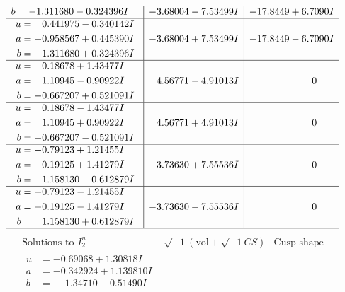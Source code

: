 \documentclass[1p]{elsarticle_modified}
\theoremstyle{definition}
\newcommand{\I}{\sqrt{-1}}
\begin{document}
$$\begin{array}{c|c|c}
\begin{aligned}
b &= -1.311680 - 0.324396 I\end{aligned}
 & -3.68004 - 7.53499 I & -17.8449 + 6.7090 I \\ \hline\begin{aligned}
u &= \phantom{-}0.441975 - 0.340142 I \\
a &= -0.958567 + 0.445390 I \\
b &= -1.311680 + 0.324396 I\end{aligned}
 & -3.68004 + 7.53499 I & -17.8449 - 6.7090 I \\ \hline\begin{aligned}
u &= \phantom{-}0.18678 + 1.43477 I \\
a &= \phantom{-}1.10945 - 0.90922 I \\
b &= -0.667207 + 0.521091 I\end{aligned}
 & \phantom{-}4.56771 - 4.91013 I & \phantom{-0.000000 } 0 \\ \hline\begin{aligned}
u &= \phantom{-}0.18678 - 1.43477 I \\
a &= \phantom{-}1.10945 + 0.90922 I \\
b &= -0.667207 - 0.521091 I\end{aligned}
 & \phantom{-}4.56771 + 4.91013 I & \phantom{-0.000000 } 0 \\ \hline\begin{aligned}
u &= -0.79123 + 1.21455 I \\
a &= -0.19125 + 1.41279 I \\
b &= \phantom{-}1.158130 - 0.612879 I\end{aligned}
 & -3.73630 + 7.55536 I & \phantom{-0.000000 } 0 \\ \hline\begin{aligned}
u &= -0.79123 - 1.21455 I \\
a &= -0.19125 - 1.41279 I \\
b &= \phantom{-}1.158130 + 0.612879 I\end{aligned}
 & -3.73630 - 7.55536 I & \phantom{-0.000000 } 0\\
 \hline 
 \end{array}$$\newpage$$\begin{array}{c|c|c}  
\text{Solutions to }I^u_{2}& \I (\text{vol} + \sqrt{-1}CS) & \text{Cusp shape}\\
 \hline 
\begin{aligned}
u &= -0.69068 + 1.30818 I \\
a &= -0.342924 + 1.139810 I \\
b &= \phantom{-}1.34710 - 0.51490 I\end{aligned}

\end{array}$$
\end{document}

